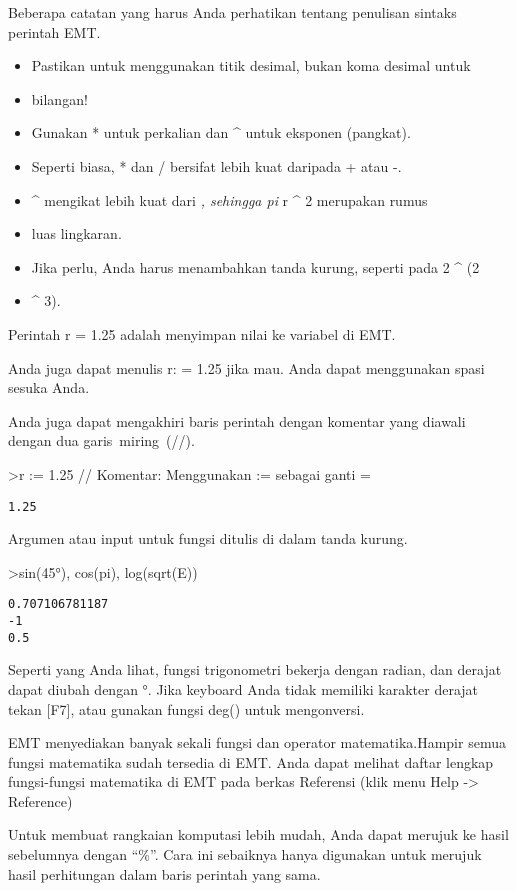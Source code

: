 \documentclass[
]{book}
\begin{document}
Beberapa catatan yang harus Anda perhatikan tentang penulisan sintaks perintah EMT.

\begin{itemize}
\item
  Pastikan untuk menggunakan titik desimal, bukan koma desimal untuk
\item
  bilangan!
\item
  Gunakan * untuk perkalian dan \^{} untuk eksponen (pangkat).
\item
  Seperti biasa, * dan / bersifat lebih kuat daripada + atau -.
\item
  \^{} mengikat lebih kuat dari \emph{, sehingga pi } r \^{} 2 merupakan rumus
\item
  luas lingkaran.
\item
  Jika perlu, Anda harus menambahkan tanda kurung, seperti pada 2 \^{} (2
\item
  \^{} 3).
\end{itemize}

Perintah r = 1.25 adalah menyimpan nilai ke variabel di EMT.

Anda juga dapat menulis r: = 1.25 jika mau. Anda dapat menggunakan spasi sesuka Anda.

Anda juga dapat mengakhiri baris perintah dengan komentar yang diawali dengan dua garis~miring~(//).

\textgreater r := 1.25 // Komentar: Menggunakan := sebagai ganti =

\begin{verbatim}
1.25
\end{verbatim}

Argumen atau input untuk fungsi ditulis di dalam tanda kurung.

\textgreater sin(45°), cos(pi), log(sqrt(E))

\begin{verbatim}
0.707106781187
-1
0.5
\end{verbatim}

Seperti yang Anda lihat, fungsi trigonometri bekerja dengan radian, dan derajat dapat diubah dengan °. Jika keyboard Anda tidak memiliki karakter derajat tekan {[}F7{]}, atau gunakan fungsi deg() untuk mengonversi.

EMT menyediakan banyak sekali fungsi dan operator matematika.Hampir semua fungsi matematika sudah tersedia di EMT. Anda dapat melihat daftar lengkap fungsi-fungsi matematika di EMT pada berkas Referensi (klik menu Help -\textgreater{} Reference)

Untuk membuat rangkaian komputasi lebih mudah, Anda dapat merujuk ke hasil sebelumnya dengan ``\%''. Cara ini sebaiknya hanya digunakan untuk merujuk hasil perhitungan dalam baris perintah yang sama.
\end{document}
